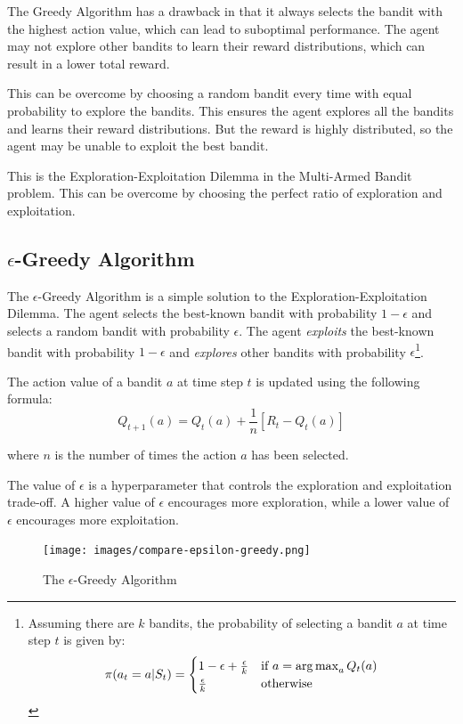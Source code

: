 The Greedy Algorithm has a drawback in that it always selects the bandit with the highest action value, which can lead to suboptimal performance. The agent may not explore other bandits to learn their reward distributions, which can result in a lower total reward.

This can be overcome by choosing a random bandit every time with equal probability to explore the bandits. This ensures the agent explores all the bandits and learns their reward distributions. But the reward is highly distributed, so the agent may be unable to exploit the best bandit.

This is the Exploration-Exploitation Dilemma in the Multi-Armed Bandit problem. This can be overcome by choosing the perfect ratio of exploration and exploitation.

\subsection{$\epsilon$-Greedy Algorithm}

The $\epsilon$-Greedy Algorithm is a simple solution to the Exploration-Exploitation Dilemma. The agent selects the best-known bandit with probability $1-\epsilon$ and selects a random bandit with probability $\epsilon$. The agent \textit{exploits} the best-known bandit with probability $1-\epsilon$ and \textit{explores} other bandits with probability $\epsilon$\footnote{Assuming there are $k$ bandits, the probability of selecting a bandit $a$ at time step $t$ is given by:
\[\pi(a_t=a|S_t) = \begin{cases}
    1-\epsilon + \frac{\epsilon}{k} & \text{if } a = \operatorname*{arg\,max}_{a} Q_t(a) \\ \frac{\epsilon}{k} & \text{otherwise}
\end{cases}\]}.

The action value of a bandit $a$ at time step $t$ is updated using the following formula:
\[Q_{t+1}(a) = Q_t(a) + \frac{1}{n}[R_t - Q_t(a)]\]

where $n$ is the number of times the action $a$ has been selected.

The value of $\epsilon$ is a hyperparameter that controls the exploration and exploitation trade-off. A higher value of $\epsilon$ encourages more exploration, while a lower value of $\epsilon$ encourages more exploitation.

\begin{figure}[h!]
    \centering
    \texttt{[image: images/compare-epsilon-greedy.png]}
    \caption{The $\epsilon$-Greedy Algorithm}
    \label{fig:epsilon_greedy}
\end{figure}

